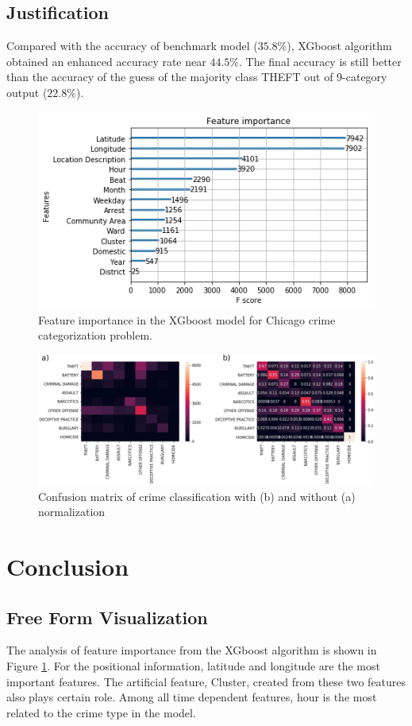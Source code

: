 \documentclass[12pt]{article}
\begin{document}
\subsection{Justification}
Compared with the accuracy of benchmark model ($35.8\%$), XGboost algorithm obtained an enhanced accuracy rate near $44.5\%$. The final accuracy is still better than the accuracy of the guess of the majority class THEFT out of 9-category output ($22.8\%$). 

\begin{figure}[ht]
\includegraphics[scale=0.8]{figure/feature_importance.png}
\centering
\caption{Feature importance in the XGboost model for Chicago crime categorization problem.}
\label{fig:xgboost}
\end{figure}

\begin{figure}[ht]
\includegraphics[scale=0.4]{figure/confusion_matrix.eps}
\centering
\caption{Confusion matrix of crime classification with (b) and without (a) normalization}
\label{fig:confusion_matrix}
\end{figure}

\section{Conclusion}
\subsection{Free Form Visualization}
The analysis of feature importance from the XGboost algorithm is shown in Figure \ref{fig:xgboost}. For the positional information, latitude and longitude are the most important features. The artificial feature, Cluster, created from these two features also plays certain role. Among all time dependent features, hour is the most related to the crime type in the model. 
\end{document}
